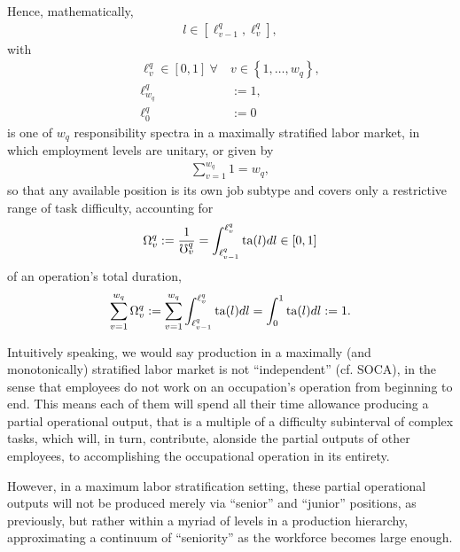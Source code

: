 \documentclass[hidelinks, nonatbib]{elsarticle}
\begin{document}
\begin{definition}
    \label{mmls_def}
    Hence, mathematically,
    \begin{gather}
    l \in \left[
    \ell_{v-1}^{q}
    ,
    \ell_{v}^{q}
    \right]
    ,
    \end{gather}
    with
    \begin{align}
    \ell_{v}^{q} \in [0,1]
    \
    \forall
    \
    &v \in 
    \left\{
        1, \dots, w_q
    \right\}
    ,
    \\
    \ell_{w_q}^{q}&:= 1
    ,
    \\
    \ell_{0}^{q} &:= 0
    \end{align}
    is one of $w_q$ responsibility spectra in a maximally stratified labor market, in which employment levels are unitary, or given by
    \begin{gather}
    \sum_{v=1}^{w_q}
    1
    =
    w_q
    ,
    \end{gather}
    so that any available position is its own job subtype and covers only a restrictive range of task difficulty, accounting for
    \begin{gather}
    \Omega_{v}^{q}
    := 
    \frac{1}{\mho_{v}^{q}}
    = 
    \int_{
        \ell_{v-1}^{q}
    }^{
        \ell_{v}^{q}
    }
    \text{ta}(l)dl
    \in [0,1]
    \end{gather}
    of an operation's total duration,
    \begin{gather}
    \sum_{v=1}^{w_q}
    \Omega_{v}^{q} 
    := 
    \sum_{v=1}^{w_q}
    \int_{
        \ell_{v-1}^{q}
    }^{
        \ell_{v}^{q}
    }
    \text{ta}(l)dl
    =
    \int_{0}^{1}
    \text{ta}(l)dl
    :=
    1
    .
    \end{gather}
    
    Intuitively speaking, we would say production in a maximally (and monotonically) stratified labor market is not ``independent'' (cf. SOCA), in the sense that employees do not work on an occupation's operation from beginning to end. This means each of them will spend all their time allowance producing a partial operational output, that is a multiple of a difficulty subinterval of complex tasks, which will, in turn, contribute, alonside the partial outputs of other employees, to accomplishing the occupational operation in its entirety.
    
    However, in a maximum labor stratification setting, these partial operational outputs will not be produced merely via ``senior'' and ``junior'' positions, as previously, but rather within a myriad of levels in a production hierarchy, approximating a continuum of ``seniority'' as the workforce becomes large enough.
    

\end{definition}
\end{document}
